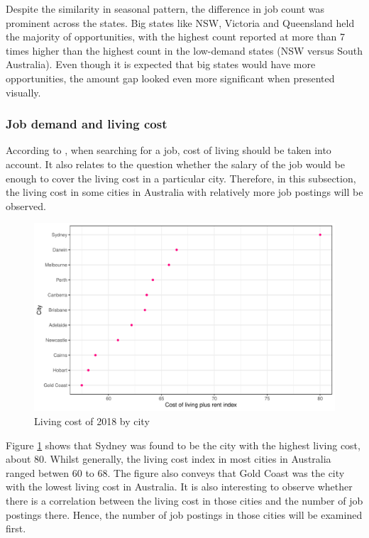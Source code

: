\documentclass[11pt,a4paper,]{article}
\begin{document}
Despite the similarity in seasonal pattern, the difference in job count was prominent across the states. Big states like NSW, Victoria and Queensland held the majority of opportunities, with the highest count reported at more than 7 times higher than the highest count in the low-demand states (NSW versus South Australia). Even though it is expected that big states would have more opportunities, the amount gap looked even more significant when presented visually.

\hypertarget{job-demand-and-living-cost}{%
\subsubsection{Job demand and living cost}\label{job-demand-and-living-cost}}

According to \textcite{davidlasswell}, when searching for a job, cost of living should be taken into account. It also relates to the question whether the salary of the job would be enough to cover the living cost in a particular city. Therefore, in this subsection, the living cost in some cities in Australia with relatively more job postings will be observed.

\begin{figure}
\centering
\includegraphics{Team_JHDP_Assignment4_files/figure-latex/livingcostplot-1.pdf}
\caption{\label{fig:livingcostplot}Living cost of 2018 by city}
\end{figure}

Figure \ref{fig:livingcostplot} shows that Sydney was found to be the city with the highest living cost, about 80. Whilst generally, the living cost index in most cities in Australia ranged betwen 60 to 68. The figure also conveys that Gold Coast was the city with the lowest living cost in Australia.
It is also interesting to observe whether there is a correlation between the living cost in those cities and the number of job postings there. Hence, the number of job postings in those cities will be examined first.
\end{document}
